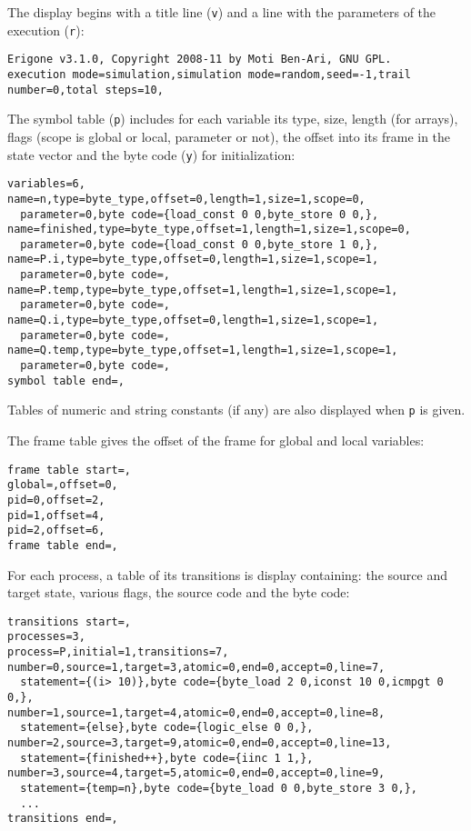 \documentclass[11pt]{article}
\newcommand*{\p}[1]{\texttt{#1}}
\begin{document}
The display begins with a title line (\p{v}) and a line
with the parameters of the execution (\p{r}):

\begin{footnotesize}
\begin{verbatim}
Erigone v3.1.0, Copyright 2008-11 by Moti Ben-Ari, GNU GPL.
execution mode=simulation,simulation mode=random,seed=-1,trail number=0,total steps=10,
\end{verbatim}
\end{footnotesize}

The symbol table (\p{p}) includes for each variable its type, size,
length (for arrays), flags (scope is global or local, parameter or not),
the offset into its frame in the state vector and the byte code (\p{y})
for initialization:

\begin{footnotesize}
\begin{verbatim}
variables=6,
name=n,type=byte_type,offset=0,length=1,size=1,scope=0,
  parameter=0,byte code={load_const 0 0,byte_store 0 0,},
name=finished,type=byte_type,offset=1,length=1,size=1,scope=0,
  parameter=0,byte code={load_const 0 0,byte_store 1 0,},
name=P.i,type=byte_type,offset=0,length=1,size=1,scope=1,
  parameter=0,byte code=,
name=P.temp,type=byte_type,offset=1,length=1,size=1,scope=1,
  parameter=0,byte code=,
name=Q.i,type=byte_type,offset=0,length=1,size=1,scope=1,
  parameter=0,byte code=,
name=Q.temp,type=byte_type,offset=1,length=1,size=1,scope=1,
  parameter=0,byte code=,
symbol table end=,
\end{verbatim}
\end{footnotesize}

Tables of numeric and string constants (if any) are also
displayed when \p{p} is given.

The frame table gives the offset of the frame for global and local
variables:
\begin{footnotesize}
\begin{verbatim}
frame table start=,
global=,offset=0,
pid=0,offset=2,
pid=1,offset=4,
pid=2,offset=6,
frame table end=,
\end{verbatim}
\end{footnotesize}

For each process, a table of its transitions is display containing: the
source and target state, various flags, the source code and the byte
code:

\begin{footnotesize}
\begin{verbatim}
transitions start=,
processes=3,
process=P,initial=1,transitions=7,
number=0,source=1,target=3,atomic=0,end=0,accept=0,line=7,
  statement={(i> 10)},byte code={byte_load 2 0,iconst 10 0,icmpgt 0 0,},
number=1,source=1,target=4,atomic=0,end=0,accept=0,line=8,
  statement={else},byte code={logic_else 0 0,},
number=2,source=3,target=9,atomic=0,end=0,accept=0,line=13,
  statement={finished++},byte code={iinc 1 1,},
number=3,source=4,target=5,atomic=0,end=0,accept=0,line=9,
  statement={temp=n},byte code={byte_load 0 0,byte_store 3 0,},
  ...
transitions end=,
\end{verbatim}
\end{footnotesize}
\end{document}

